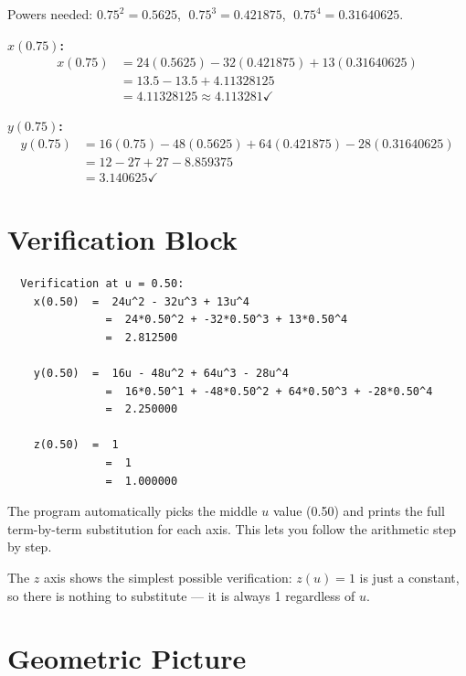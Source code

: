 \documentclass[12pt, a4paper]{article}
\begin{document}
\begin{examplebox}
Powers needed: $0.75^2 = 0.5625$, $\; 0.75^3 = 0.421875$,
$\; 0.75^4 = 0.31640625$.

\medskip
\textbf{$x(0.75)$:}
\begin{align*}
  x(0.75) &= 24(0.5625) - 32(0.421875) + 13(0.31640625) \\
           &= 13.5 - 13.5 + 4.11328125 \\
           &= 4.11328125 \approx 4.113281 \checkmark
\end{align*}

\textbf{$y(0.75)$:}
\begin{align*}
  y(0.75) &= 16(0.75) - 48(0.5625) + 64(0.421875) - 28(0.31640625) \\
           &= 12 - 27 + 27 - 8.859375 \\
           &= 3.140625 \checkmark
\end{align*}
\end{examplebox}


\section{Verification Block}

\begin{verbatim}
  Verification at u = 0.50:
    x(0.50)  =  24u^2 - 32u^3 + 13u^4
               =  24*0.50^2 + -32*0.50^3 + 13*0.50^4
               =  2.812500

    y(0.50)  =  16u - 48u^2 + 64u^3 - 28u^4
               =  16*0.50^1 + -48*0.50^2 + 64*0.50^3 + -28*0.50^4
               =  2.250000

    z(0.50)  =  1
               =  1
               =  1.000000
\end{verbatim}

The program automatically picks the middle $u$ value (0.50) and
prints the full term-by-term substitution for each axis.
This lets you follow the arithmetic step by step.

The $z$ axis shows the simplest possible verification:
$z(u) = 1$ is just a constant, so there is nothing to substitute ---
it is always 1 regardless of $u$.


\section{Geometric Picture}
\end{document}
